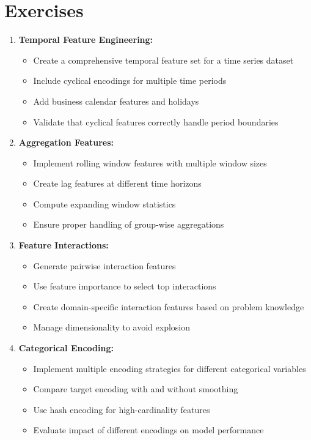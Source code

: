 \section{Exercises}

\begin{enumerate}
    \item \textbf{Temporal Feature Engineering:}
    \begin{itemize}
        \item Create a comprehensive temporal feature set for a time series dataset
        \item Include cyclical encodings for multiple time periods
        \item Add business calendar features and holidays
        \item Validate that cyclical features correctly handle period boundaries
    \end{itemize}

    \item \textbf{Aggregation Features:}
    \begin{itemize}
        \item Implement rolling window features with multiple window sizes
        \item Create lag features at different time horizons
        \item Compute expanding window statistics
        \item Ensure proper handling of group-wise aggregations
    \end{itemize}

    \item \textbf{Feature Interactions:}
    \begin{itemize}
        \item Generate pairwise interaction features
        \item Use feature importance to select top interactions
        \item Create domain-specific interaction features based on problem knowledge
        \item Manage dimensionality to avoid explosion
    \end{itemize}

    \item \textbf{Categorical Encoding:}
    \begin{itemize}
        \item Implement multiple encoding strategies for different categorical variables
        \item Compare target encoding with and without smoothing
        \item Use hash encoding for high-cardinality features
        \item Evaluate impact of different encodings on model performance
    \end{itemize}


\end{enumerate}
